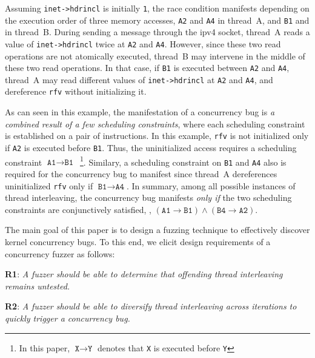 Assuming \texttt{inet->hdrincl} is initially \texttt{1}, the race
condition manifests depending on the execution order of three memory
accesses, \texttt{A2} and \texttt{A4} in thread~A, and \texttt{B1} and
in thread~B.
%
During sending a message through the ipv4 socket, thread~A reads a
value of \texttt{inet->hdrincl} twice at \texttt{A2} and \texttt{A4}.
%
However, since these two read operations are not atomically executed,
thread~B may intervene in the middle of these two read operations.
%
In that case, if \texttt{B1} is executed between \texttt{A2} and
\texttt{A4}, thread~A may read different values of
\texttt{inet->hdrincl} at \texttt{A2} and \texttt{A4}, and dereference
\texttt{rfv} without initializing it.



As can seen in this example, the manifestation of a concurrency bug is
\textit{a combined result of a few scheduling constraints}, where each
scheduling constraint is established on a pair of instructions.
%
In this example, \texttt{rfv} is not initialized only if \texttt{A2}
is executed before \texttt{B1}. Thus, the uninitialized access
requires a scheduling constraint
$\texttt{A1} \rightarrow \texttt{B1}$~\footnote{In this paper,
  $\texttt{X} \rightarrow \texttt{Y}$ denotes that \texttt{X} is
  executed before \texttt{Y}}.
%
Similary, a scheduling constraint on \texttt{B1} and \texttt{A4} also
is required for the concurrency bug to manifest since thread~A
dereferences uninitialized \texttt{rfv} only if
$\texttt{B1} \rightarrow \texttt{A4}$.
%
In summary, among all possible instances of thread interleaving, the
concurrency bug manifests \textit{only if} the two scheduling
constraints are conjunctively satisfied, \ie,
$(\texttt{A1} \rightarrow \texttt{B1}) \wedge (\texttt{B4} \rightarrow
\texttt{A2})$.


%
%
The main goal of this paper is to design a fuzzing technique to
effectively discover kernel concurrency bugs. To this end, we elicit
design requirements of a concurrency fuzzer as follows:

\vspace{0.4em}
%
\textbf{R1}: \emph{A fuzzer should be able to determine that offending
  thread interleaving remains untested.}

\textbf{R2}: \emph{A fuzzer should be able to diversify thread
  interleaving across iterations to quickly trigger a concurrency
  bug.}
%
\vspace{0.4em}

